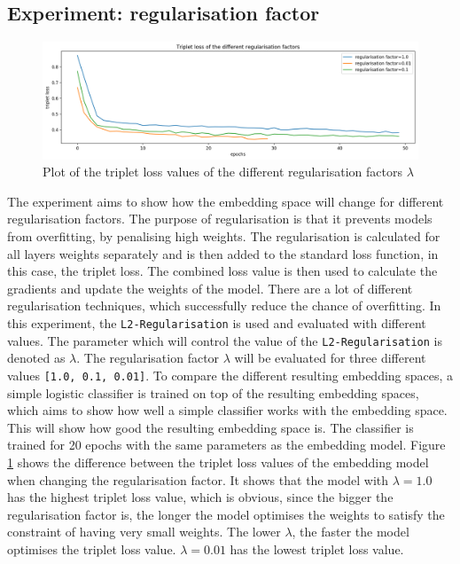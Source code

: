 \subsection{Experiment: regularisation factor}
\label{sub:Experiment-Regularisation-Factor}
\begin{figure}[H]
\centering
    \includegraphics[width=0.95\linewidth]{img/experiment_regularisation_triplet_loss.png}
    \caption{Plot of the triplet loss values of the different regularisation factors $\lambda$}
    \label{fig:plot-triplet-loss}
\end{figure}
\noindent
The experiment aims to show how the embedding space will change for different regularisation factors. The purpose of regularisation is that it prevents models from overfitting, by penalising high weights. The regularisation is calculated for all layers weights separately and is then added to the standard loss function, in this case, the triplet loss. The combined loss value is then used to calculate the gradients and update the weights of the model. There are a lot of different regularisation techniques, which successfully reduce the chance of overfitting. In this experiment, the \texttt{L2-Regularisation} is used and evaluated with different values. The parameter which will control the value of the \texttt{L2-Regularisation} is denoted as $\lambda$. The regularisation factor $\lambda$ will be evaluated for three different values \texttt{[1.0, 0.1, 0.01]}.
\newline
\newline
To compare the different resulting embedding spaces, a simple logistic classifier is trained on top of the resulting embedding spaces, which aims to show how well a simple classifier works with the embedding space. This will show how good the resulting embedding space is. The classifier is trained for 20 epochs with the same parameters as the embedding model.
\newline
\newline
Figure \ref{fig:plot-triplet-loss} shows the difference between the triplet loss values of the embedding model when changing the regularisation factor. It shows that the model with $\lambda = 1.0$ has the highest triplet loss value, which is obvious, since the bigger the regularisation factor is, the longer the model optimises the weights to satisfy the constraint of having very small weights. The lower $\lambda$, the faster the model optimises the triplet loss value. $\lambda = 0.01$ has the lowest triplet loss value.
